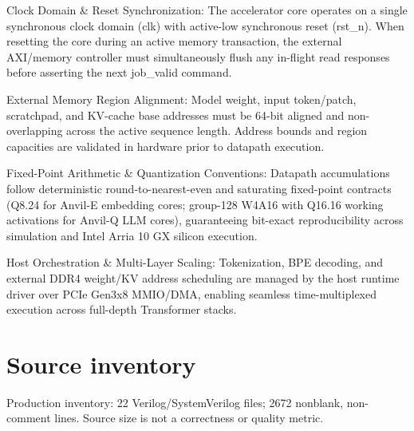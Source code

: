 \documentclass[11pt,a4paper]{article}
\begin{document}
Clock Domain \& Reset Synchronization: The accelerator core operates on a single synchronous clock domain (\allowbreak{}clk)\allowbreak{} with active-low synchronous reset (\allowbreak{}rst\_\allowbreak{}n)\allowbreak{}. When resetting the core during an active memory transaction,\allowbreak{} the external AXI/\allowbreak{}memory controller must simultaneously flush any in-flight read responses before asserting the next job\_\allowbreak{}valid command.


External Memory Region Alignment: Model weight,\allowbreak{} input token/\allowbreak{}patch,\allowbreak{} scratchpad,\allowbreak{} and KV-cache base addresses must be 64-bit aligned and non-overlapping across the active sequence length. Address bounds and region capacities are validated in hardware prior to datapath execution.


Fixed-Point Arithmetic \& Quantization Conventions: Datapath accumulations follow deterministic round-to-nearest-even and saturating fixed-point contracts (\allowbreak{}Q8.24 for Anvil-E embedding cores; group-128 W4A16 with Q16.16 working activations for Anvil-Q LLM cores)\allowbreak{},\allowbreak{} guaranteeing bit-exact reproducibility across simulation and Intel Arria 10 GX silicon execution.


Host Orchestration \& Multi-Layer Scaling: Tokenization,\allowbreak{} BPE decoding,\allowbreak{} and external DDR4 weight/\allowbreak{}KV address scheduling are managed by the host runtime driver over PCIe Gen3x8 MMIO/\allowbreak{}DMA,\allowbreak{} enabling seamless time-multiplexed execution across full-depth Transformer stacks.


\appendix{}\section{Source inventory}

Production inventory: 22 Verilog/\allowbreak{}SystemVerilog files; 2672 nonblank,\allowbreak{} non-comment lines. Source size is not a correctness or quality metric.
\end{document}
